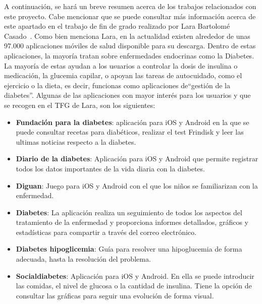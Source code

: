 A continuación, se hará un breve resumen acerca de los trabajos relacionados con este proyecto. Cabe mencionar que se puede consultar más información acerca de este apartado en el trabajo de fin de grado realizado por Lara Bartolomé Casado~\cite{larab2015}.
Como bien menciona Lara, en la actualidad existen alrededor de unas 97.000 aplicaciones móviles de salud disponible para su descarga. Dentro de estas aplicaciones, la mayoría tratan sobre enfermedades endocrinas como la Diabetes.  La mayoría de estas ayudan a los usuarios a controlar la dosis de insulina o medicación, la glucemia capilar, o apoyan las tareas de autocuidado, como el ejercicio o la dieta, es decir, funcionas como aplicaciones de``gestión de la diabetes''. 
Algunas de las aplicaciones con mayor interés para los usuarios y que se recogen en el TFG de Lara, son los siguientes:
\begin{itemize}
	\item \textbf{Fundación para la diabetes}: aplicación para iOS y Android en la que se puede consultar recetas para diabéticos, realizar el test Frindisk y leer las ultimas noticias respecto a la diabetes.
	\item \textbf{Diario de la diabetes}: Aplicación para iOS y Android que permite registrar todos los datos importantes de la vida diaria con la diabetes.
	\item \textbf{Diguan}: Juego para iOS y Android con el que los niños se familiarizan con la enfermedad.
	\item \textbf{Diabetes}: La aplicación realiza un seguimiento de todos los aspectos del tratamiento de la enfermedad y proporciona informes detallados, gráficos y estadísticas para compartir a través del correo electrónico.
	\item \textbf{Diabetes hipoglicemia}: Guía para resolver una hipoglucemia de forma adecuada, hasta la resolución del problema.
	\item \textbf{Socialdiabetes}: Aplicación para iOS y Android. En ella se puede introducir las comidas, el nivel de glucosa o la cantidad de insulina. Tiene la opción de consultar las gráficas para seguir una evolución de forma visual.
\end{itemize}


